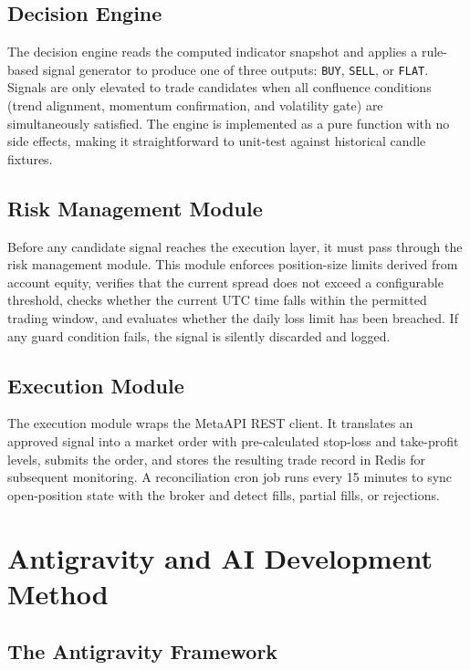 \documentclass[conference]{IEEEtran}
\begin{document}
\subsection{Decision Engine}

The decision engine reads the computed indicator snapshot and applies
a rule-based signal generator to produce one of three outputs:
\texttt{BUY}, \texttt{SELL}, or \texttt{FLAT}.  Signals are only
elevated to trade candidates when all confluence conditions (trend
alignment, momentum confirmation, and volatility gate) are
simultaneously satisfied.  The engine is implemented as a pure
function with no side effects, making it straightforward to unit-test
against historical candle fixtures.

\subsection{Risk Management Module}

Before any candidate signal reaches the execution layer, it must pass
through the risk management module.  This module enforces
position-size limits derived from account equity, verifies that the
current spread does not exceed a configurable threshold, checks
whether the current UTC time falls within the permitted trading
window, and evaluates whether the daily loss limit has been breached.
If any guard condition fails, the signal is silently discarded and
logged.

\subsection{Execution Module}

The execution module wraps the MetaAPI REST client.  It translates an
approved signal into a market order with pre-calculated stop-loss and
take-profit levels, submits the order, and stores the resulting trade
record in Redis for subsequent monitoring.  A reconciliation cron job
runs every 15 minutes to sync open-position state with the broker and
detect fills, partial fills, or rejections.

\section{Antigravity and AI Development Method}

\subsection{The Antigravity Framework}
\end{document}
